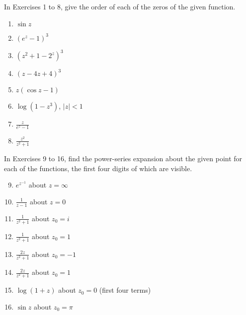 \documentclass[12pt]{article}
\theoremstyle{definition} %
\theoremstyle{plain} %
\begin{document}
In Exercises 1 to 8, give the order of each of the zeros of the given function.
\begin{enumerate}
    \item $\sin z$
    \item $(e^z - 1)^3$
    \item $(z^2 + 1 - 2^z)^3$
    \item $(z - 4z + 4)^3$
    \item $z(\cos z - 1)$
    \item $\log(1 - z^3)$, \quad $|z| < 1$
    \item $\frac{z}{e^z - 1}$
    \item $\frac{z^2}{z^2 + 1}$
\end{enumerate}

In Exercises 9 to 16, find the power-series expansion about the given point for each of the functions, the first four digits of which are visible.

\begin{enumerate}
    \setcounter{enumi}{8}
    \item $e^{z^{-1}}$ about $z = \infty$
    \item $\frac{1}{z - 1}$ about $z = 0$
    \item $\frac{1}{z^2 + 1}$ about $z_0 = i$
    \item $\frac{1}{z^2 + 1}$ about $z_0 = 1$
    \item $\frac{2z}{z^2 + 1}$ about $z_0 = -1$
    \item $\frac{2z}{z^2 + 1}$ about $z_0 = 1$
    \item $\log(1 + z)$ about $z_0 = 0$ (first four terms)
    \item $\sin z$ about $z_0 = \pi$
\end{enumerate}
\end{document}
